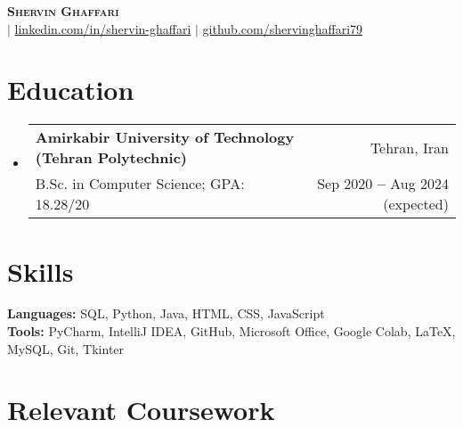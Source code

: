 \documentclass[letterpaper,11pt]{article}
\makeatletter
\newcommand{\resumeEducationHeading}[4]{
  \vspace{-2pt}\item
    \begin{tabular*}{0.97\textwidth}[t]{l@{\extracolsep{\fill}}r}
      \textbf{#1} & #2 \\
      {\small#3} & {\small #4} \\
    \end{tabular*}\vspace{-5pt}
}
\newcommand{\resumeSubHeadingListStart}{\begin{itemize}[leftmargin=0.15in, label={}]}
\newcommand{\resumeSubHeadingListEnd}{\end{itemize}}
\makeatother
\begin{document}

\begin{center}
    \textbf{\Huge \scshape Shervin Ghaffari} \\ \vspace{5pt}
    \small
    \faEnvelope \thickspace {}
    $|$
    \faLinkedinSquare \hspace{.5pt} \href{https://www.linkedin.com/in/shervin-ghaffari}{linkedin.com/in/shervin-ghaffari}
    $|$
    \faGithub \hspace{.5pt} \href{https://github.com/shervinghaffari79}{github.com/shervinghaffari79}
\end{center}




\section{Education}
  \vspace{3pt}
  \resumeSubHeadingListStart
    
    \resumeEducationHeading
      {Amirkabir University of Technology (Tehran Polytechnic)
      }{Tehran, Iran} 
    {B.Sc. in Computer Science;   GPA: 18.28/20}{Sep 2020 \textbf{--} Aug 2024 (expected)}
    
  \resumeSubHeadingListEnd




\section{Skills}
  \vspace{2pt}
  \resumeSubHeadingListStart
    \small{\item{
        \textbf{Languages: }{SQL, Python, Java, HTML, CSS, JavaScript} \\
        \vspace{3pt}
        \textbf{Tools: }{PyCharm, IntelliJ IDEA, GitHub, Microsoft Office, Google Colab, LaTeX, MySQL, Git, Tkinter}
    }}
  \resumeSubHeadingListEnd


\section*{Relevant Coursework}
\end{document}
